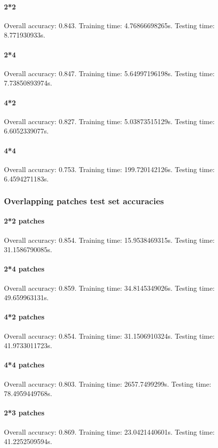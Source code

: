 \paragraph{2*2}
Overall accuracy: 0.843. Training time: 4.76866698265s. Testing time: 8.771930933s.
\paragraph{2*4}
Overall accuracy: 0.847. Training time: 5.64997196198s. Testing time: 7.73850893974s.
\paragraph{4*2}
Overall accuracy: 0.827. Training time: 5.03873515129s. Testing time: 6.6052339077s.
\paragraph{4*4}
Overall accuracy: 0.753. Training time: 199.720142126s. Testing time: 6.4594271183s.

\subsubsection{Overlapping patches test set accuracies}
\paragraph{2*2 patches}
Overall accuracy: 0.854. Training time: 15.9538469315s. Testing time: 31.1586790085s.
\paragraph{2*4 patches}
Overall accuracy: 0.859. Training time: 34.8145349026s. Testing time: 49.659963131s.
\paragraph{4*2 patches}
Overall accuracy: 0.854. Training time: 31.1506910324s. Testing time: 41.9733011723s.
\paragraph{4*4 patches}
Overall accuracy: 0.803. Training time: 2657.7499299s. Testing time: 78.4959449768s.
\paragraph{2*3 patches}
Overall accuracy: 0.869. Training time: 23.0421440601s. Testing time: 41.2252509594s.

